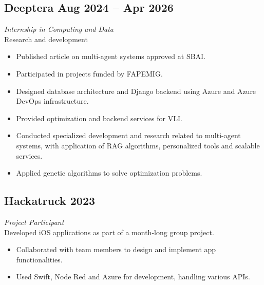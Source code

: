 \documentclass[a4paper,10pt]{article}
\begin{document}
\subsection*{Deeptera \hfill Aug 2024 -- Apr 2026}
\textit{Internship in Computing and Data} \\
Research and development
\begin{itemize}
    \item Published article on multi-agent systems approved at SBAI.
    \item Participated in projects funded by FAPEMIG.
    \item Designed database architecture and Django backend using Azure and Azure DevOps infrastructure.
    \item Provided optimization and backend services for VLI.
    \item Conducted specialized development and research related to multi-agent systems, with application of RAG algorithms, personalized tools and scalable services.
    \item Applied genetic algorithms to solve optimization problems.
\end{itemize}

\subsection*{Hackatruck \hfill 2023}
\textit{Project Participant} \\
Developed iOS applications as part of a month-long group project.
\begin{itemize}
    \item Collaborated with team members to design and implement app functionalities.
    \item Used Swift, Node Red and Azure for development, handling various APIs.
\end{itemize}
\end{document}
